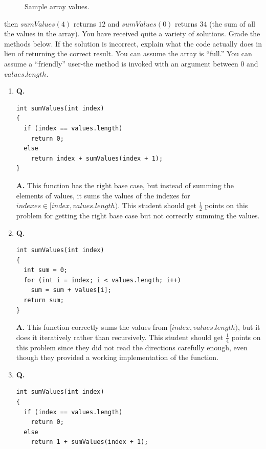 \documentclass[12pt]{article}
\begin{document}
\begin{enumerate}
  \begin{figure}[!htb]
        \caption{\label{fig:values} Sample array values.}
\end{figure}
  
  then $sumValues(4)$ returns $12$ and $sumValues(0)$ returns $34$ (the sum of all the values in the array). You have received quite a variety of solutions. Grade the methods below. If the solution is incorrect, explain what the code actually does in lieu of returning the correct result. You can assume the array is ``full.'' You can assume a ``friendly'' user-the method is invoked with an argument between $0$ and $values.length$.
  \begin{enumerate}[label=\Alph*]
  \item \textbf{Q.}
    \begin{lstlisting}
int sumValues(int index)
{
  if (index == values.length)
    return 0;
  else
    return index + sumValues(index + 1);
}
    \end{lstlisting}
  \textbf{A.} This function has the right base case, but instead of summing the elements of values, it sums the values of the indexes for $indexes \in [index, values.length)$. This student should get $\frac{1}{2}$ points on this problem for getting the right base case but not correctly summing the values.
  \\
  \item \textbf{Q.}
    \begin{lstlisting}
int sumValues(int index)
{
  int sum = 0;
  for (int i = index; i < values.length; i++)
    sum = sum + values[i];
  return sum;
}
    \end{lstlisting}
  \textbf{A.} This function correctly sums the values from $[index, values.length)$, but it does it iteratively rather than recursively. This student should get $\frac{1}{4}$ points on this problem since they did not read the directions carefully enough, even though they provided a working implementation of the function.
  \\
  \item \textbf{Q.}
    \begin{lstlisting}
int sumValues(int index)
{
  if (index == values.length)
    return 0;
  else
    return 1 + sumValues(index + 1);

\end{lstlisting}
\end{enumerate}
\end{enumerate}
\end{document}

